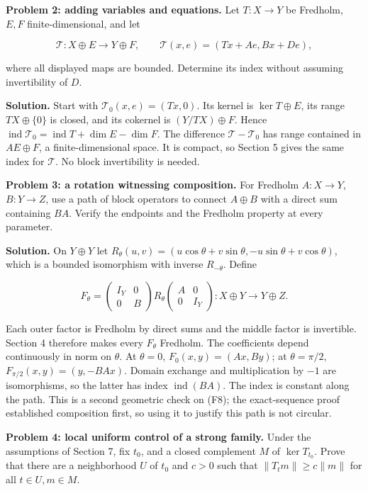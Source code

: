 \documentclass[
  11pt,
]{article}
\begin{document}
\textbf{Problem 2: adding variables and equations.} Let \(T:X\to Y\) be
Fredholm, \(E,F\) finite-dimensional, and let

\[
\mathcal T:X\oplus E\to Y\oplus F,\qquad
\mathcal T(x,e)=(Tx+Ae,Bx+De),                                 \tag{F23}
\]

where all displayed maps are bounded. Determine its index without
assuming invertibility of \(D\).

\textbf{Solution.} Start with \(\mathcal T_0(x,e)=(Tx,0)\). Its kernel
is \(\ker T\oplus E\), its range \(TX\oplus\{0\}\) is closed, and its
cokernel is \((Y/TX)\oplus F\). Hence
\(\operatorname{ind}\mathcal T_0=\operatorname{ind}T+\dim E-\dim F\).
The difference \(\mathcal T-\mathcal T_0\) has range contained in
\(AE\oplus F\), a finite-dimensional space. It is compact, so Section 5
gives the same index for \(\mathcal T\). No block invertibility is
needed.

\textbf{Problem 3: a rotation witnessing composition.} For Fredholm
\(A:X\to Y\), \(B:Y\to Z\), use a path of block operators to connect
\(A\oplus B\) with a direct sum containing \(BA\). Verify the endpoints
and the Fredholm property at every parameter.

\textbf{Solution.} On \(Y\oplus Y\) let
\(R_\theta(u,v)=(u\cos\theta+v\sin\theta,-u\sin\theta+v\cos\theta)\),
which is a bounded isomorphism with inverse \(R_{-\theta}\). Define

\[
F_\theta=
\begin{pmatrix}I_Y&0\\0&B\end{pmatrix}
R_\theta
\begin{pmatrix}A&0\\0&I_Y\end{pmatrix}:X\oplus Y\to Y\oplus Z.
                                                                    \tag{F24}
\]

Each outer factor is Fredholm by direct sums and the middle factor is
invertible. Section 4 therefore makes every \(F_\theta\) Fredholm. The
coefficients depend continuously in norm on \(\theta\). At \(\theta=0\),
\(F_0(x,y)=(Ax,By)\); at \(\theta=\pi/2\), \(F_{\pi/2}(x,y)=(y,-BAx)\).
Domain exchange and multiplication by \(-1\) are isomorphisms, so the
latter has index \(\operatorname{ind}(BA)\). The index is constant along
the path. This is a second geometric check on (F8); the exact-sequence
proof established composition first, so using it to justify this path is
not circular.

\textbf{Problem 4: local uniform control of a strong family.} Under the
assumptions of Section 7, fix \(t_0\), and a closed complement \(M\) of
\(\ker T_{t_0}\). Prove that there are a neighborhood \(U\) of \(t_0\)
and \(c>0\) such that \(\|T_tm\|\geq c\|m\|\) for all \(t\in U,m\in M\).
\end{document}
